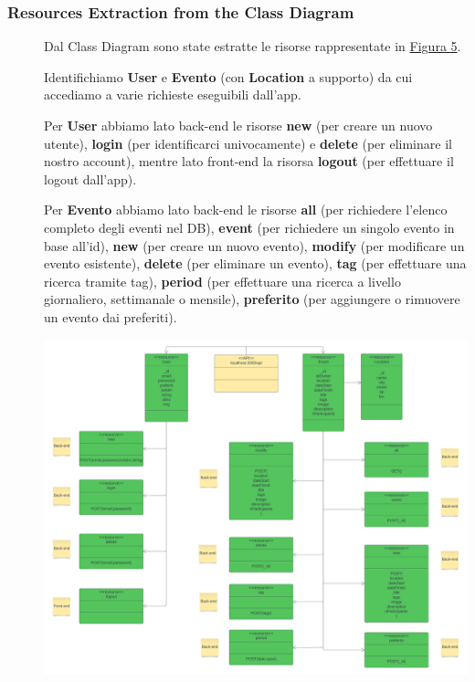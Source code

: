 \documentclass{article}
\begin{document}
\subsubsection{Resources Extraction from the Class Diagram}
\begin{description}
    \item[] Dal Class Diagram sono state estratte le risorse rappresentate in \hyperref[img:5]{Figura 5}.
    \item[] Identifichiamo \textbf{User} e \textbf{Evento} (con \textbf{Location} a supporto) da cui accediamo a varie richieste eseguibili dall'app.
    \item[] Per \textbf{User} abbiamo lato back-end le risorse \textbf{new} (per creare un nuovo utente), \textbf{login} (per identificarci univocamente) e \textbf{delete} (per eliminare il nostro account), mentre lato front-end la risorsa \textbf{logout} (per effettuare il logout dall'app).
    \item[] Per \textbf{Evento} abbiamo lato back-end le risorse \textbf{all} (per richiedere l'elenco completo degli eventi nel DB), \textbf{event} (per richiedere un singolo evento in base all'id), \textbf{new} (per creare un nuovo evento), \textbf{modify} (per modificare un evento esistente), \textbf{delete} (per eliminare un evento), \textbf{tag} (per effettuare una ricerca tramite tag), \textbf{period} (per effettuare una ricerca a livello giornaliero, settimanale o mensile), \textbf{preferito} (per aggiungere o rimuovere un evento dai preferiti).
    \item[] \label{img:5} \begin{center}
            \includegraphics[scale=0.4]{resources.png}
        \end{center}
\end{description}
\end{document}
